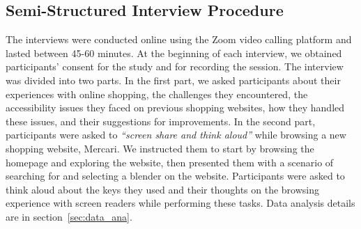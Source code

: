 \subsection{Semi-Structured Interview Procedure} 
The interviews were conducted online using the Zoom video calling platform and lasted between 45-60 minutes. At the beginning of each interview, we obtained participants' consent for the study and for recording the session. The interview was divided into two parts. In the first part, we asked participants about their experiences with online shopping, the challenges they encountered, the accessibility issues they faced on previous shopping websites, how they handled these issues, and their suggestions for improvements. In the second part, participants were asked to \textit{``screen share and think aloud''} while browsing a new shopping website, Mercari. We instructed them to start by browsing the homepage and exploring the website, then presented them with a scenario of searching for and selecting a blender on the website. Participants were asked to think aloud about the keys they used and their thoughts on the browsing experience with screen readers while performing these tasks. Data analysis details are in section~\ref{sec:data_ana}.




